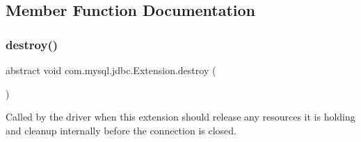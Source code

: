 \subsection{Member Function Documentation}
\mbox{\label{interfacecom_1_1mysql_1_1jdbc_1_1_extension_a7d9644de305efed5df71f3fcc7cc1772}} 
\subsubsection{\texorpdfstring{destroy()}{destroy()}}
{\footnotesize\ttfamily abstract void com.\+mysql.\+jdbc.\+Extension.\+destroy (\begin{DoxyParamCaption}{ }\end{DoxyParamCaption})\hspace{0.3cm}{\ttfamily [abstract]}}

Called by the driver when this extension should release any resources it is holding and cleanup internally before the connection is closed. 

